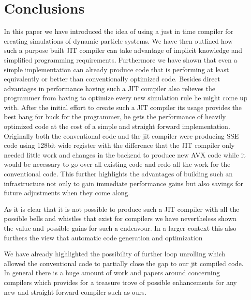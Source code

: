 \section{Conclusions}

In this paper we have introduced the idea of using a just in time compiler for creating simulations of dynamic particle systems. We have then outlined how such a purpose built JIT compiler can take advantage of implicit knowledge and simplified programming requirements. Furthermore we have shown that even a simple implementation can already produce code that is performing at least equivalently or better than conventionally optimized code. Besides direct advantages in performance having such a JIT compiler also relieves the programmer from having to optimize every new simulation rule he might come up with. After the initial effort to create such a JIT compiler its usage provides the best bang for buck for the programmer, he gets the performance of heavily optimized code at the cost of a simple and straight forward implementation. Originally both the conventional code and the jit compiler were producing SSE code using 128bit wide register with the difference that the JIT compiler only needed little work and changes in the backend to produce new AVX code while it would be necessary to go over all existing code and redo all the work for the conventional code. This further highlights the advantages of building such an infrastructure not only to gain immediate performance gains but also savings for future adjustments when they come along. 

As it is clear that it is not possible to produce such a JIT compiler with all the possible bells and whistles that exist for compilers we have nevertheless shown the value and possible gains for such a endeavour. In a larger context this also furthers the view that automatic code generation and optimization 

 We have already highlighted the possibility of further loop unrolling which allowed the conventional code to partially close the gap to our jit compiled code. In general there is a huge amount of work and papers around concerning compilers which provides for a treasure trove of possible enhancements for any new and straight forward compiler such as ours. 